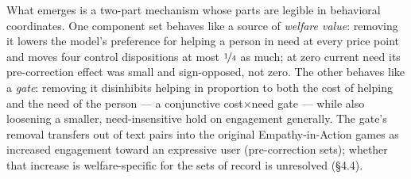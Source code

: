 \documentclass{article}
\begin{document}
What emerges is a two-part mechanism whose parts are legible in behavioral
coordinates. One component set behaves like a source of \emph{welfare value}:
removing it lowers the model's preference for helping a person in need at
every price point and moves four control dispositions at most $\nicefrac{1}{4}$ as much; at
zero current need its pre-correction effect was small and sign-opposed, not zero. The other behaves like a
\emph{gate}: removing it disinhibits helping in proportion to both the cost
of helping and the need of the person — a conjunctive cost$\times$need gate —
while also loosening a smaller, need-insensitive hold on engagement generally.
The gate's removal transfers out of text pairs into the original
Empathy-in-Action games as increased engagement toward an expressive user
(pre-correction sets); whether that increase is welfare-specific for the sets
of record is unresolved (\S4.4).
\end{document}
